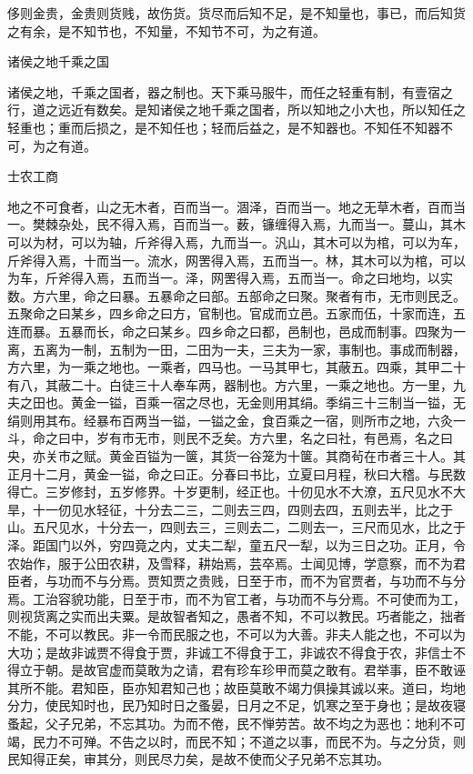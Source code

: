 \documentclass[]{article}
\begin{document}
侈则金贵，金贵则货贱，故伤货。货尽而后知不足，是不知量也，事已，而后知货之有余，是不知节也，不知量，不知节不可，为之有道。

诸侯之地千乘之国

诸侯之地，千乘之国者，器之制也。天下乘马服牛，而任之轻重有制，有壹宿之行，道之远近有数矣。是知诸侯之地千乘之国者，所以知地之小大也，所以知任之轻重也；重而后损之，是不知任也；轻而后益之，是不知器也。不知任不知器不可，为之有道。

士农工商

地之不可食者，山之无木者，百而当一。涸泽，百而当一。地之无草木者，百而当一。樊棘杂处，民不得入焉，百而当一。薮，镰缠得入焉，九而当一。蔓山，其木可以为材，可以为轴，斤斧得入焉，九而当一。汎山，其木可以为棺，可以为车，斤斧得入焉，十而当一。流水，网罟得入焉，五而当一。林，其木可以为棺，可以为车，斤斧得入焉，五而当一。泽，网罟得入焉，五而当一。命之曰地均，以实数。方六里，命之曰暴。五暴命之曰部。五部命之曰聚。聚者有市，无市则民乏。五聚命之曰某乡，四乡命之曰方，官制也。官成而立邑。五家而伍，十家而连，五连而暴。五暴而长，命之曰某乡。四乡命之曰都，邑制也，邑成而制事。四聚为一离，五离为一制，五制为一田，二田为一夫，三夫为一家，事制也。事成而制器，方六里，为一乘之地也。一乘者，四马也。一马其甲七，其蔽五。四乘，其甲二十有八，其蔽二十。白徒三十人奉车两，器制也。方六里，一乘之地也。方一里，九夫之田也。黄金一镒，百乘一宿之尽也，无金则用其绢。季绢三十三制当一镒，无绢则用其布。经暴布百两当一镒，一镒之金，食百乘之一宿，则所市之地，六灸一斗，命之曰中，岁有市无市，则民不乏矣。方六里，名之曰社，有邑焉，名之曰央，亦关市之赋。黄金百镒为一箧，其货一谷笼为十箧。其商茍在市者三十人。其正月十二月，黄金一镒，命之曰正。分春曰书比，立夏曰月程，秋曰大稽。与民数得亡。三岁修封，五岁修界。十岁更制，经正也。十仞见水不大潦，五尺见水不大旱，十一仞见水轻征，十分去二三，二则去三四，四则去四，五则去半，比之于山。五尺见水，十分去一，四则去三，三则去二，二则去一，三尺而见水，比之于泽。距国门以外，穷四竟之内，丈夫二犁，童五尺一犁，以为三日之功。正月，令农始作，服于公田农耕，及雪释，耕始焉，芸卒焉。士闻见博，学意察，而不为君臣者，与功而不与分焉。贾知贾之贵贱，日至于市，而不为官贾者，与功而不与分焉。工治容貌功能，日至于市，而不为官工者，与功而不与分焉。不可使而为工，则视货离之实而出夫粟。是故智者知之，愚者不知，不可以教民。巧者能之，拙者不能，不可以教民。非一令而民服之也，不可以为大善。非夫人能之也，不可以为大功；是故非诚贾不得食于贾，非诚工不得食于工，非诚农不得食于农，非信士不得立于朝。是故官虚而莫敢为之请，君有珍车珍甲而莫之敢有。君举事，臣不敢诬其所不能。君知臣，臣亦知君知己也；故臣莫敢不竭力俱操其诚以来。道曰，均地分力，使民知时也，民乃知时日之蚤晏，日月之不足，饥寒之至于身也；是故夜寝蚤起，父子兄弟，不忘其功。为而不倦，民不惮劳苦。故不均之为恶也：地利不可竭，民力不可殚。不告之以时，而民不知；不道之以事，而民不为。与之分货，则民知得正矣，审其分，则民尽力矣，是故不使而父子兄弟不忘其功。
\end{document}
